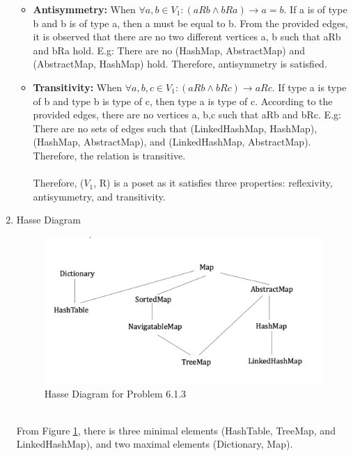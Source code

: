 \begin{enumerate}
\begin{itemize}
        \item \textbf{Antisymmetry: } When $\forall a, b \in V_{1}: (aRb \wedge bRa) \rightarrow a = b$. If a is of type b and b is of type a, then a must be equal to b. From the provided edges, it is observed that there are no two different vertices a, b such that aRb and bRa hold. E.g: There are no (HashMap, AbstractMap) and (AbstractMap, HashMap) hold. Therefore, antisymmetry is satisfied.
        \item \textbf{Transitivity: } When $\forall a, b, c \in V_{1}: (aRb \wedge bRc) \rightarrow aRc$. If type a is type of b and type b is type of c, then type a is type of c. According to the provided edges, there are no vertices a, b,c such that aRb and bRc. E.g: There are no sets of edges such that (LinkedHashMap, HashMap), (HashMap, AbstractMap), and (LinkedHashMap, AbstractMap). Therefore, the relation is transitive.\\ \\
        Therefore, ($V_{1}$, R) is a poset as it satisfies three properties: reflexivity, antisymmetry, and transitivity. 
    \end{itemize}
    \item Hasse Diagram \\
    \begin{figure}[hbt!]
        \centering
        \includegraphics[scale=0.5]{HasseProblem613.png}
        \caption{Hasse Diagram for Problem 6.1.3}
        \label{fig:Hasse613}
    \end{figure}\\
    From Figure \ref{fig:Hasse613}, there is three minimal elements (HashTable, TreeMap, and LinkedHashMap), and two maximal elements (Dictionary, Map).
\end{enumerate}
